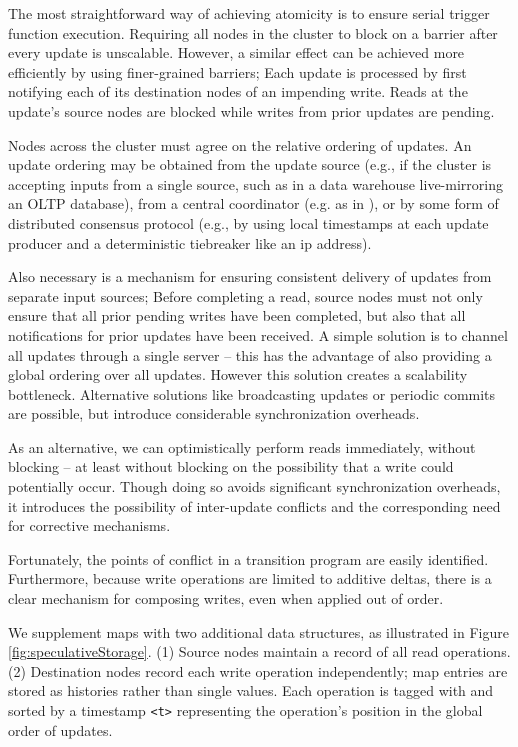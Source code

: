 The most straightforward way of achieving atomicity is to ensure serial trigger function execution.  Requiring all nodes in the cluster to block on a barrier after every update is unscalable.  However, a similar effect can be achieved more efficiently by using finer-grained barriers; Each update is processed by first notifying each of its destination nodes of an impending write.  Reads at the update's source nodes are blocked while writes from prior updates are pending.

Nodes across the cluster must agree on the relative ordering of updates.  An update ordering may be obtained from the update source (e.g., if the cluster is accepting inputs from a single source, such as in a data warehouse live-mirroring an OLTP database), from a central coordinator (e.g. as in \cite{google paper}), or by some form of distributed consensus protocol (e.g., by using local timestamps at each update producer and a deterministic tiebreaker like an ip address).

Also necessary is a mechanism for ensuring consistent delivery of updates from separate input sources; Before completing a read, source nodes must not only ensure that all prior pending writes have been completed, but also that all notifications for prior updates have been received.  A simple solution is to channel all updates through a single server -- this has the advantage of also providing a global ordering over all updates.  However this solution creates a scalability bottleneck.  Alternative solutions like broadcasting updates or periodic commits are possible, but introduce considerable synchronization overheads.

As an alternative, we can optimistically perform reads immediately, without blocking -- at least without blocking on the possibility that a write could potentially occur.  Though doing so avoids significant synchronization overheads, it introduces the possibility of inter-update conflicts and the corresponding need for corrective mechanisms.  

Fortunately, the points of conflict in a transition program are easily identified.  Furthermore, because write operations are limited to additive deltas, there is a clear mechanism for composing writes, even when applied out of order.

We supplement maps with two additional data structures, as illustrated in Figure \ref{fig:speculativeStorage}.  (1) Source nodes maintain a record of all read operations.  (2) Destination nodes record each write operation independently; map entries are stored as histories rather than single values.  Each operation is tagged with and sorted by a timestamp \texttt{<t>} representing the operation's position in the global order of updates.

